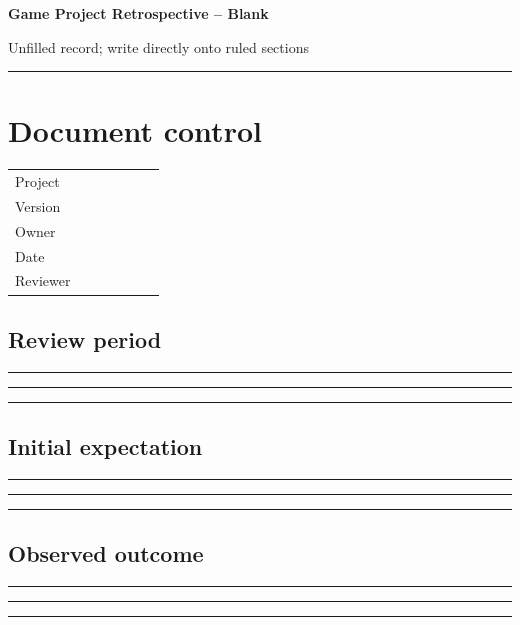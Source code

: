 \documentclass[11pt]{article}
\begin{document}
{\huge\bfseries\color{suiteblue} Game Project Retrospective -- Blank}\par
\vspace{0.15in}
{\normalsize\color{suitegray} Unfilled record; write directly onto ruled sections}\par
\vspace{0.15in}\hrule\vspace{0.15in}

\section{Document control}
\renewcommand{\arraystretch}{1.8}
\begin{tabularx}{\linewidth}{@{}p{0.30\linewidth}X@{}}\toprule
Project & \hrulefill\\ Version & \hrulefill\\ Owner & \hrulefill\\ Date & \hrulefill\\ Reviewer & \hrulefill\\ \bottomrule\end{tabularx}

\subsection{Review period}
\noindent\rule{\linewidth}{0.3pt}\par\vspace{0.18in}
\noindent\rule{\linewidth}{0.3pt}\par\vspace{0.18in}
\noindent\rule{\linewidth}{0.3pt}\par\vspace{0.14in}

\subsection{Initial expectation}
\noindent\rule{\linewidth}{0.3pt}\par\vspace{0.18in}
\noindent\rule{\linewidth}{0.3pt}\par\vspace{0.18in}
\noindent\rule{\linewidth}{0.3pt}\par\vspace{0.14in}

\subsection{Observed outcome}
\noindent\rule{\linewidth}{0.3pt}\par\vspace{0.18in}
\noindent\rule{\linewidth}{0.3pt}\par\vspace{0.18in}
\noindent\rule{\linewidth}{0.3pt}\par\vspace{0.14in}
\end{document}
